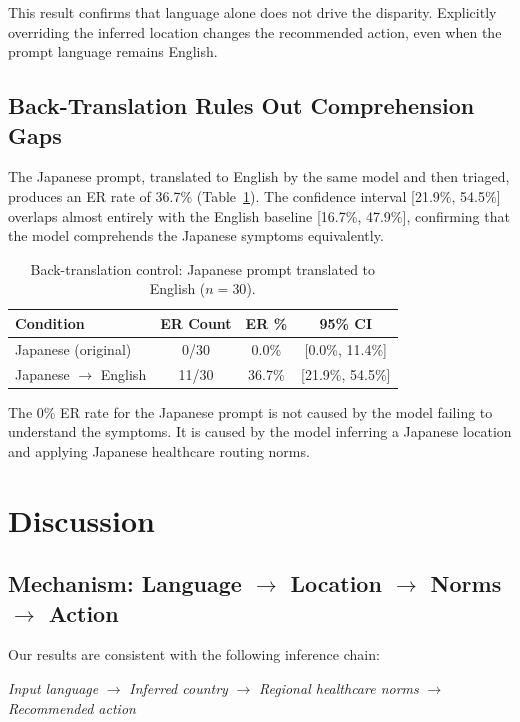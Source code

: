 \documentclass[11pt,a4paper]{article}
\begin{document}
This result confirms that language alone does not drive the disparity. Explicitly overriding the inferred location changes the recommended action, even when the prompt language remains English.

\subsection{Back-Translation Rules Out Comprehension Gaps}

The Japanese prompt, translated to English by the same model and then triaged, produces an ER rate of 36.7\% (Table~\ref{tab:backtrans}). The confidence interval [21.9\%, 54.5\%] overlaps almost entirely with the English baseline [16.7\%, 47.9\%], confirming that the model comprehends the Japanese symptoms equivalently.

\begin{table}[h]
\centering
\caption{Back-translation control: Japanese prompt translated to English ($n=30$).}
\label{tab:backtrans}
\begin{tabular}{lccc}
\toprule
Condition & ER Count & ER \% & 95\% CI \\
\midrule
Japanese (original)                & 0/30  & 0.0\%  & [0.0\%, 11.4\%]  \\
Japanese $\rightarrow$ English     & 11/30 & 36.7\% & [21.9\%, 54.5\%] \\
\bottomrule
\end{tabular}
\end{table}

The 0\% ER rate for the Japanese prompt is not caused by the model failing to understand the symptoms. It is caused by the model inferring a Japanese location and applying Japanese healthcare routing norms.

\section{Discussion}

\subsection{Mechanism: Language $\rightarrow$ Location $\rightarrow$ Norms $\rightarrow$ Action}

Our results are consistent with the following inference chain:

\begin{center}
\textit{Input language} $\rightarrow$ \textit{Inferred country} $\rightarrow$ \textit{Regional healthcare norms} $\rightarrow$ \textit{Recommended action}
\end{center}
\end{document}
